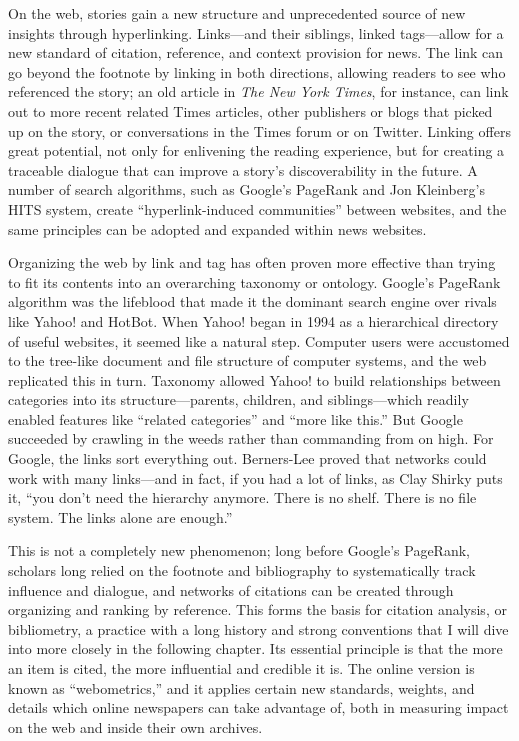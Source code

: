 On the web, stories gain a new structure and unprecedented source of new insights through hyperlinking. Links---and their siblings, linked tags---allow for a new standard of citation, reference, and context provision for news. The link can go beyond the footnote by linking in both directions, allowing readers to see who referenced the story; an old article in \emph{The New York Times}, for instance, can link out to more recent related Times articles, other publishers or blogs that picked up on the story, or conversations in the Times forum or on Twitter. Linking offers great potential, not only for enlivening the reading experience, but for creating a traceable dialogue that can improve a story's discoverability in the future. A number of search algorithms, such as Google's PageRank and Jon Kleinberg's HITS system, create ``hyperlink-induced communities'' between websites, and the same principles can be adopted and expanded within news websites.\autocite[12]{chakrabarti_mining_2003}

Organizing the web by link and tag has often proven more effective than trying to fit its contents into an overarching taxonomy or ontology. Google's PageRank algorithm was the lifeblood that made it the dominant search engine over rivals like Yahoo! and HotBot.\autocite{shirky_ontology_2005} When Yahoo! began in 1994 as a hierarchical directory of useful websites, it seemed like a natural step. Computer users were accustomed to the tree-like document and file structure of computer systems, and the web replicated this in turn. Taxonomy allowed Yahoo! to build relationships between categories into its structure---parents, children, and siblings---which readily enabled features like ``related categories'' and ``more like this.'' But Google succeeded by crawling in the weeds rather than commanding from on high. For Google, the links sort everything out. Berners-Lee proved that networks could work with many links---and in fact, if you had a lot of links, as Clay Shirky puts it, ``you don't need the hierarchy anymore. There is no shelf. There is no file system. The links alone are enough.''\autocite{shirky_ontology_2005}

This is not a completely new phenomenon; long before Google's PageRank, scholars long relied on the footnote and bibliography to systematically track influence and dialogue, and networks of citations can be created through organizing and ranking by reference. This forms the basis for citation analysis, or bibliometry, a practice with a long history and strong conventions that I will dive into more closely in the following chapter. Its essential principle is that the more an item is cited, the more influential and credible it is. The online version is known as ``webometrics,'' and it applies certain new standards, weights, and details which online newspapers can take advantage of, both in measuring impact on the web and inside their own archives.

